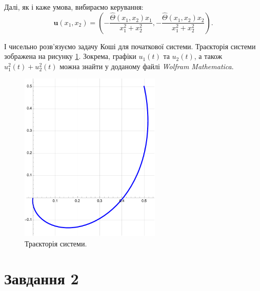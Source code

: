 \documentclass{hw_template}
\begin{document}
Далі, як і каже умова, вибираємо керування:
\begin{equation*}
    \mathbf{u}(x_1,x_2) = \left(-\frac{\hat{\Theta}(x_1,x_2)x_1}{x_1^2+x_2^2}, -\frac{\hat{\Theta}(x_1,x_2)x_2}{x_1^2+x_2^2}\right).
\end{equation*}

І чисельно розв'язуємо задачу Коші для початкової системи. Траєкторія системи
зображена на рисунку \ref{fig:trajectory}. Зокрема, графіки $u_1(t)$ та
$u_2(t)$, а також $u_1^2(t)+u_2^2(t)$ можна знайти у доданому файлі
\textit{Wolfram Mathematica}.

\begin{figure}[H]
    \centering
    \includegraphics[width=0.6\textwidth]{figures/trajectory.pdf}
    \caption{Траєкторія системи.}
    \label{fig:trajectory}
\end{figure}

\newpage

\section{Завдання 2}
\end{document}
